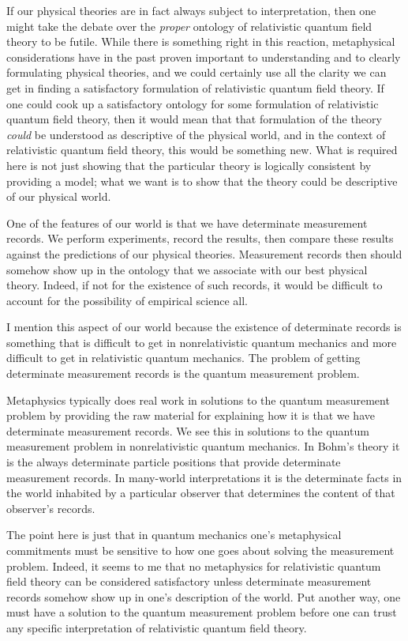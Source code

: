 \documentclass [12pt]{article}
\begin{document}
If our physical theories are in fact always subject to interpretation, then
one might take the debate over the {\em proper\/} ontology of relativistic quantum
field theory to be futile.  While there is something right in this
reaction, metaphysical considerations have in the past proven important
to understanding and to clearly formulating physical theories, and we could
certainly use all the clarity we can get in finding a satisfactory formulation
of relativistic quantum field theory.  If one could cook up a satisfactory
ontology for some formulation of relativistic quantum field theory, then
it would mean that that formulation of the theory {\em could\/} be understood
as descriptive of the physical world, and in the context of relativistic
quantum field theory, this would be something new.  What is required here
is not just showing that the particular theory is logically consistent by
providing a model; what we want is to show that the theory could be
descriptive of our physical world.

One of the features of our world is that we have determinate measurement
records.  We perform experiments, record the results, then compare these
results against the predictions of our physical theories.  Measurement
records then should somehow show up in the ontology
that we associate with our best physical theory.  Indeed, if not
for the existence of such records, it would be difficult
to account for the possibility of empirical science all.

I mention this aspect of our world because the existence of determinate
records is something that is difficult to get in nonrelativistic quantum
mechanics and more difficult to get in relativistic quantum
mechanics.  The problem of getting determinate measurement records is the
quantum measurement problem.

Metaphysics typically does real work in solutions to the quantum
measurement problem by providing the raw material for explaining
how it is that we have determinate measurement records.  We see this in
solutions to the quantum measurement problem in nonrelativistic quantum mechanics.  In
Bohm's theory it is the always determinate particle positions that
provide determinate measurement records.  In many-world interpretations
it is the determinate facts in the world inhabited by a particular
observer that determines the content of that observer's records.

The point here is just that in quantum mechanics one's metaphysical
commitments must be sensitive to how one goes about solving the measurement
problem.  Indeed, it seems to me that no metaphysics for relativistic
quantum field theory can be considered satisfactory unless determinate
measurement records somehow show up in one's description of the world.
Put another way, one must have a solution to the quantum
measurement problem before one can trust any specific interpretation
of relativistic quantum field theory.
\end{document}
